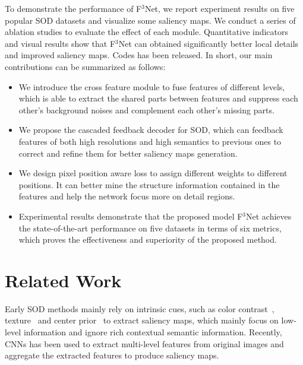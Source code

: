 \documentclass[letterpaper]{article} %
\begin{document}
To demonstrate the performance of F$^3$Net, we report experiment results on five popular SOD datasets and visualize some saliency maps. We conduct a series of ablation studies to evaluate the effect of each module. Quantitative indicators and visual results show that F$^3$Net can obtained significantly better local details and improved saliency maps. Codes has been released. In short, our main contributions can be summarized as follows:
\begin{itemize}
  \item We introduce the cross feature module to fuse features of different levels, which is able to extract the shared parts between features and suppress each other's background noises and complement each other's missing parts.
  \item We propose the cascaded feedback decoder for SOD, which can feedback features of both high resolutions and high semantics to previous ones to correct and refine them for better saliency maps generation.
  \item We design pixel position aware loss to assign different weights to different positions. It can better mine the structure information contained in the features and help the network focus more on detail regions.
  \item Experimental results demonstrate that the proposed model F$^3$Net achieves the state-of-the-art performance on five datasets in terms of six metrics, which proves the effectiveness and superiority of the proposed method.
\end{itemize}

\section{Related Work}
Early SOD methods mainly rely on intrinsic cues, such as color contrast~\cite{ChengMHTH15}, texture~\cite{ECSSD} and center prior~\cite{JiangD13} to extract saliency maps, which mainly focus on low-level information and ignore rich contextual semantic information. Recently, CNNs has been used to extract multi-level features from original images and aggregate the extracted features to produce saliency maps. 
\end{document}
